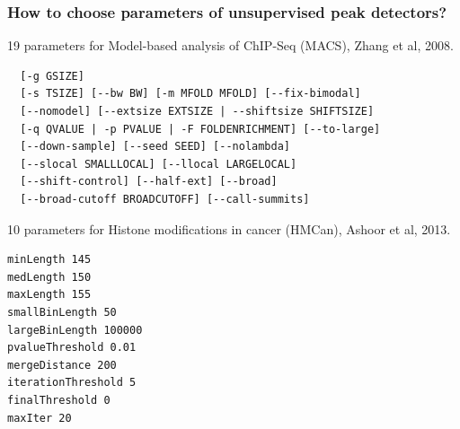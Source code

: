 \documentclass{beamer}
\begin{document}
\begin{frame}[fragile]
  \frametitle{How to choose parameters of unsupervised peak
    detectors?}
\scriptsize
19 parameters for Model-based analysis of ChIP-Seq (MACS), Zhang et al, 2008.
\begin{verbatim}
  [-g GSIZE]
  [-s TSIZE] [--bw BW] [-m MFOLD MFOLD] [--fix-bimodal]
  [--nomodel] [--extsize EXTSIZE | --shiftsize SHIFTSIZE]
  [-q QVALUE | -p PVALUE | -F FOLDENRICHMENT] [--to-large]
  [--down-sample] [--seed SEED] [--nolambda]
  [--slocal SMALLLOCAL] [--llocal LARGELOCAL]
  [--shift-control] [--half-ext] [--broad]
  [--broad-cutoff BROADCUTOFF] [--call-summits]
\end{verbatim}
10 parameters for Histone modifications in cancer (HMCan),
Ashoor et al, 2013.
\begin{verbatim}
minLength 145
medLength 150
maxLength 155
smallBinLength 50
largeBinLength 100000
pvalueThreshold 0.01
mergeDistance 200
iterationThreshold 5
finalThreshold 0
maxIter 20
\end{verbatim}
\end{frame}
\end{document}
